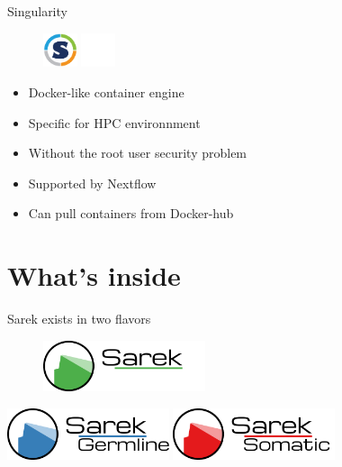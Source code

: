 \documentclass[usepdftitle=false]{beamer}
\begin{document}
\begin{frame}{Singularity}
	\begin{figure}
		\includegraphics[height=1cm]{pictures/Singularity}
		\includegraphics[height=1cm]{pictures/blank}
	\end{figure}
	\begin{itemize}
		\item Docker-like container engine
		\item Specific for HPC environnment
		\pause
		\item Without the root user security problem
		\pause
		\item Supported by Nextflow
		\pause
		\item Can pull containers from Docker-hub
	\end{itemize}
\end{frame}

\section{What's inside}

\begin{frame}{Sarek exists in two flavors}
	\begin{figure}
		\includegraphics[height=1.5cm]{pictures/Sarek}
	\end{figure}
	\vfill
	\pause
	\begin{center}
		\includegraphics[height=1.5cm]{pictures/Sarek_germline}
		\hfill
		\pause
		\includegraphics[height=1.5cm]{pictures/Sarek_somatic}
	\end{center}
	\end{frame}
\end{document}
